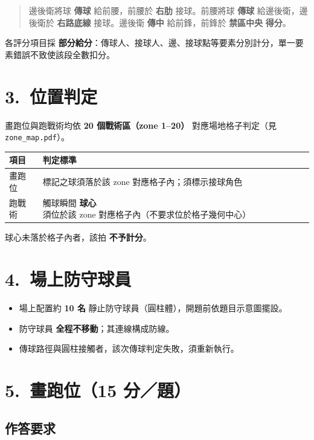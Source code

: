 \documentclass[11pt]{article}
\newcommand{\term}[1]{\textbf{#1}}
\begin{document}
\begin{quote}
邊後衛將球 \term{傳球} 給前腰，前腰於 \term{右肋} 接球。前腰將球 \term{傳球} 給邊後衛，邊後衛於 \term{右路底線} 接球。邊後衛 \term{傳中} 給前鋒，前鋒於 \term{禁區中央} \term{得分}。
\end{quote}

各評分項目採 \term{部分給分}：傳球人、接球人、邊、接球點等要素分別計分，單一要素錯誤不致使該段全數扣分。

\section*{3.\ 位置判定}

畫跑位與跑戰術均依 \term{20 個戰術區（zone 1--20）} 對應場地格子判定（見 \texttt{zone\_map.pdf}）。

\vspace{0.4em}
\begin{tabular}{@{}ll@{}}
\toprule
\textbf{項目} & \textbf{判定標準} \\
\midrule
畫跑位 & 標記之球須落於該 zone 對應格子內；須標示接球角色 \\
跑戰術 & 觸球瞬間 \term{球心} 須位於該 zone 對應格子內（不要求位於格子幾何中心） \\
\bottomrule
\end{tabular}

\vspace{0.4em}
\noindent
球心未落於格子內者，該拍 \term{不予計分}。

\section*{4.\ 場上防守球員}

\begin{itemize}
  \item 場上配置約 \term{10 名} 靜止防守球員（圓柱體），開題前依題目示意圖擺設。
  \item 防守球員 \term{全程不移動}；其連線構成防線。
  \item 傳球路徑與圓柱接觸者，該次傳球判定失敗，須重新執行。
\end{itemize}

\section*{5.\ 畫跑位（15 分／題）}

\subsection*{作答要求}
\end{document}
